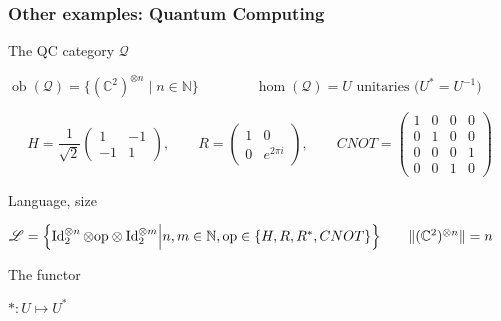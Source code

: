 \documentclass[10pt]{beamer}
\newcommand{\cat}[1]{\mathscr{#1}}
\renewcommand{\L}{\cat{L}}
\newcommand{\size}[1]{\lVert#1\rVert}
\DeclareMathOperator{\ob}{ob}
\DeclareMathOperator{\Id}{Id}
\newcommand{\N}{\mathbb{N}}
\newcommand{\Complex}{\mathbb{C}}
\begin{document}
\begin{frame}
  \frametitle{Other examples: Quantum Computing}

  \begin{block}{The QC category $\cat{Q}$}
    \begin{center}
    $\ob(\cat{Q}) = \{\left(\Complex^2\right)^{\otimes n}\;|\;n\in\N\}
    \qquad\qquad \hom(\cat{Q}) = U \text{ unitaries
      ($U^\ast=U^{-1}$)}$
    \end{center}
  \end{block}

  \begin{equation*}
    H = \frac{1}{\sqrt{2}}\begin{pmatrix}
      1 & -1 \\ -1 & 1
    \end{pmatrix},
    \qquad
    R = \begin{pmatrix}
      1 & 0 \\ 0 & e^{2\pi i }
    \end{pmatrix},
    \qquad
    CNOT = \begin{pmatrix}
      1 & 0 & 0 & 0\\
      0 & 1 & 0 & 0\\
      0 & 0 & 0 & 1\\
      0 & 0 & 1 & 0
    \end{pmatrix}
  \end{equation*}

  \begin{block}{Language, size}
    \begin{center}
      $\L = \Bigl\{\Id_2^{\otimes
        n}\otimes\mathrm{op}\otimes\Id_2^{\otimes m}\Bigl\lvert
      n,m\in\N, \mathrm{op}\in\{H,R,R^\ast,CNOT\} \Bigr\} \qquad
      \size{(\Complex^2)^{\otimes n}} = n$
    \end{center}
  \end{block}
  
  \begin{block}{The functor}
    \begin{center}
      $\ast : U\mapsto U^\ast$
    \end{center}
  \end{block}
\end{frame}
\end{document}
